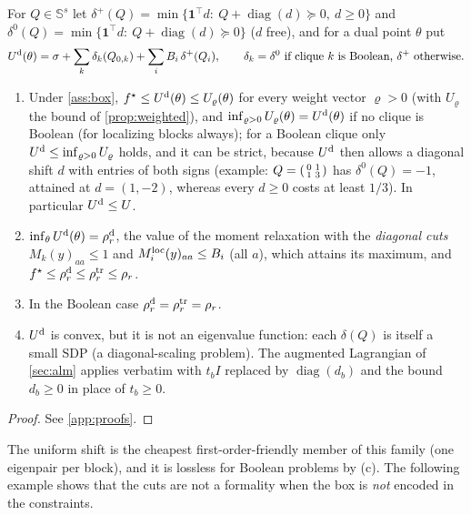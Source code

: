\documentclass[a4paper,11pt]{article}
\theoremstyle{plain}
\theoremstyle{definition}
\theoremstyle{remark}
\newcommand{\Sym}{\mathbb{S}}
\newcommand{\diag}{\operatorname{diag}}
\begin{document}
\begin{proposition}\label{prop:diag}
For $Q\in\Sym^s$ let $\delta^+(Q)=\min\{\mathbf 1^\top d:\ Q+\diag(d)\succeq0,\ d\ge0\}$ and $\delta^0(Q)=\min\{\mathbf 1^\top d:\ Q+\diag(d)\succeq0\}$ ($d$ free), and for a dual point $\theta$ put
\[
U^{\rm d}(\theta)=\sigma+\sum_k\delta_k(Q_{0,k})+\sum_iB_i\,\delta^+(Q_i),\qquad \delta_k=\delta^0\ \text{if clique $k$ is Boolean, }\delta^+\text{ otherwise.}
\]
\begin{enumerate}[label=(\alph*),leftmargin=2em,nosep]
\item Under \cref{ass:box}, $f^\star\le U^{\rm d}(\theta)\le U_\varrho(\theta)$ for every weight vector $\varrho>0$ (with $U_\varrho$ the bound of \cref{prop:weighted}), and $\inf_{\varrho>0}U_\varrho(\theta)=U^{\rm d}(\theta)$ if no clique is Boolean (for localizing blocks always); for a Boolean clique only $U^{\rm d}\le\inf_{\varrho>0}U_\varrho$ holds, and it can be strict, because $U^{\rm d}$ then allows a diagonal shift $d$ with entries of both signs (example: $Q=\begin{psmallmatrix}0&1\\1&3\end{psmallmatrix}$ has $\delta^0(Q)=-1$, attained at $d=(1,-2)$, whereas every $d\ge0$ costs at least $1/3$). In particular $U^{\rm d}\le U$.
\item $\inf_\theta U^{\rm d}(\theta)=\rho_r^{\rm d}$, the value of the moment relaxation with the \emph{diagonal cuts} $M_k(y)_{aa}\le1$ and $M_i^{\rm loc}(y)_{aa}\le B_i$ (all $a$), which attains its maximum, and
$f^\star\le\rho_r^{\rm d}\le\rho_r^{\rm tr}\le\rho_r$.
\item In the Boolean case $\rho_r^{\rm d}=\rho_r^{\rm tr}=\rho_r$.
\item $U^{\rm d}$ is convex, but it is not an eigenvalue function: each $\delta(Q)$ is itself a small SDP (a diagonal-scaling problem). The augmented Lagrangian of \cref{sec:alm} applies verbatim with $t_bI$ replaced by $\diag(d_b)$ and the bound $d_b\ge0$ in place of $t_b\ge0$.
\end{enumerate}
\end{proposition}
\begin{proof}
See \cref{app:proofs}.
\end{proof}
The uniform shift is the cheapest first-order-friendly member of this family (one eigenpair per block), and it is lossless for Boolean problems by (c). The following example shows that the cuts are not a formality when the box is \emph{not} encoded in the constraints.
\end{document}

